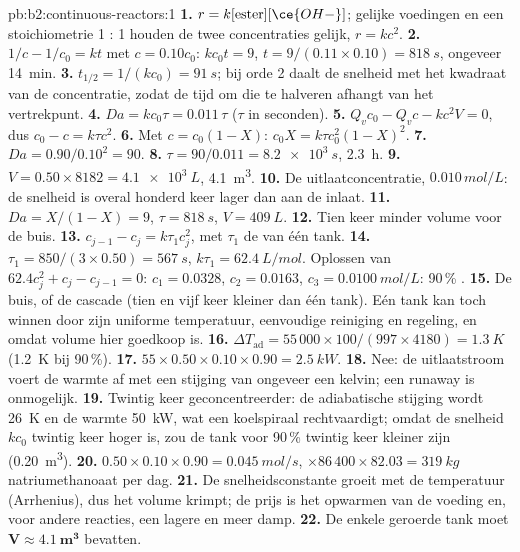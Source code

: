 \begin{solution}{pb:b2:continuous-reactors:1}
\textbf{1.} $r = k[\text{ester}][\ce{OH-}]$; gelijke voedingen en een stoichiometrie
1 : 1 houden de twee concentraties gelijk, $r = kc^2$.
\textbf{2.} $1/c - 1/c_0 = kt$ met $c = 0.10c_0$: $kc_0t = 9$, $t = 9/(0.11
\times 0.10) = \qty{818}{s}$, ongeveer \qty{14}{min}.
\textbf{3.} $t_{1/2} = 1/(kc_0) = \qty{91}{s}$; bij orde 2 daalt de snelheid met
het kwadraat van de concentratie, zodat de tijd om die te halveren afhangt van het
vertrekpunt.
\textbf{4.} $Da = kc_0\tau = 0.011\,\tau$ ($\tau$ in seconden).
\textbf{5.} $Q_vc_0 - Q_vc - kc^2V = 0$, dus $c_0 - c = k\tau c^2$.
\textbf{6.} Met $c = c_0(1 - X)$: $c_0X = k\tau c_0^2(1 - X)^2$.
\textbf{7.} $Da = 0.90/0.10^2 = 90$.
\textbf{8.} $\tau = 90/0.011 = \qty{8.2e3}{s}$, \qty{2.3}{h}.
\textbf{9.} $V = 0.50 \times 8182 = \qty{4.1e3}{L}$, \qty{4.1}{m^3}.
\textbf{10.} De uitlaatconcentratie, $0.010\,\unit{mol/L}$: de snelheid is
overal honderd keer lager dan aan de inlaat.
\textbf{11.} $Da = X/(1 - X) = 9$, $\tau = \qty{818}{s}$, $V = \qty{409}{L}$.
\textbf{12.} Tien keer minder volume voor de buis.
\textbf{13.} $c_{j-1} - c_j = k\tau_1c_j^2$, met $\tau_1$ de  van
één tank.
\textbf{14.} $\tau_1 = 850/(3 \times 0.50) = \qty{567}{s}$, $k\tau_1 =
\qty{62.4}{L/mol}$. Oplossen van $62.4c_j^2 + c_j - c_{j-1} = 0$: $c_1 = 0.0328$,
$c_2 = 0.0163$, $c_3 = \qty{0.0100}{mol/L}$: 90\,\% .
\textbf{15.} De buis, of de cascade (tien en vijf keer kleiner dan één
tank). Eén tank kan toch winnen door zijn uniforme temperatuur, eenvoudige
reiniging en regeling, en omdat volume hier goedkoop is.
\textbf{16.} $\Delta T_{\text{ad}} = 55\,000 \times 100/(997 \times 4180) =
\qty{1.3}{K}$ (\qty{1.2}{K} bij 90\,\%).
\textbf{17.} $55 \times 0.50 \times 0.10 \times 0.90 = \qty{2.5}{kW}$.
\textbf{18.} Nee: de uitlaatstroom voert de warmte af met een stijging van ongeveer
een kelvin; een runaway is onmogelijk.
\textbf{19.} Twintig keer geconcentreerder: de adiabatische stijging wordt
\qty{26}{K} en de warmte \qty{50}{kW}, wat een koelspiraal rechtvaardigt; omdat de snelheid $kc_0$
twintig keer hoger is, zou de tank voor 90\,\% twintig keer kleiner zijn
(\qty{0.20}{m^3}).
\textbf{20.} $0.50 \times 0.10 \times 0.90 = \qty{0.045}{mol/s}$, $\times 86\,400
\times 82.03 = \qty{319}{kg}$ natriumethanoaat per dag.
\textbf{21.} De snelheidsconstante groeit met de temperatuur (Arrhenius), dus het
volume krimpt; de prijs is het opwarmen van de voeding en, voor andere
reacties, een lagere  en meer damp.
\textbf{22.} De enkele geroerde tank moet $\boldsymbol{V \approx
\qty{4.1}{m^3}}$ bevatten.
\end{solution}
